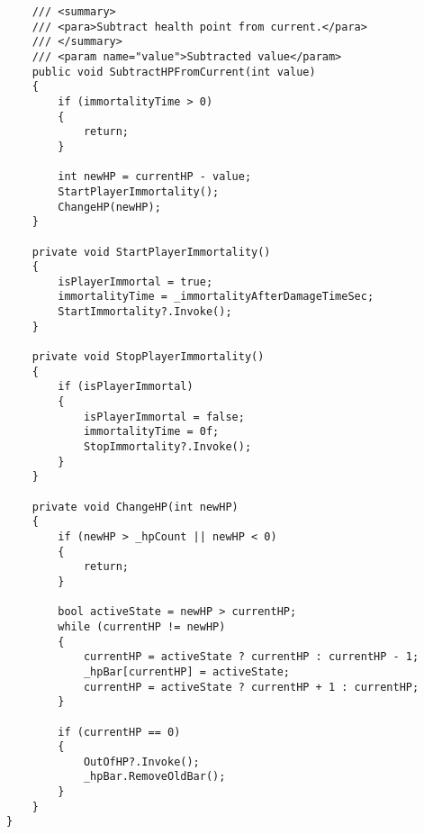 \begin{verbatim}
    /// <summary>
    /// <para>Subtract health point from current.</para>
    /// </summary>
    /// <param name="value">Subtracted value</param>
    public void SubtractHPFromCurrent(int value)
    {
        if (immortalityTime > 0)
        {
            return;
        }

        int newHP = currentHP - value;
        StartPlayerImmortality();
        ChangeHP(newHP);
    }

    private void StartPlayerImmortality()
    {
        isPlayerImmortal = true;
        immortalityTime = _immortalityAfterDamageTimeSec;
        StartImmortality?.Invoke();
    }

    private void StopPlayerImmortality()
    {
        if (isPlayerImmortal)
        {
            isPlayerImmortal = false;
            immortalityTime = 0f;
            StopImmortality?.Invoke();
        }
    }

    private void ChangeHP(int newHP)
    {
        if (newHP > _hpCount || newHP < 0)
        {
            return;
        }

        bool activeState = newHP > currentHP;
        while (currentHP != newHP)
        {
            currentHP = activeState ? currentHP : currentHP - 1;
            _hpBar[currentHP] = activeState;
            currentHP = activeState ? currentHP + 1 : currentHP;
        }

        if (currentHP == 0)
        {
            OutOfHP?.Invoke();
            _hpBar.RemoveOldBar();
        }
    }
}
\end{verbatim}
